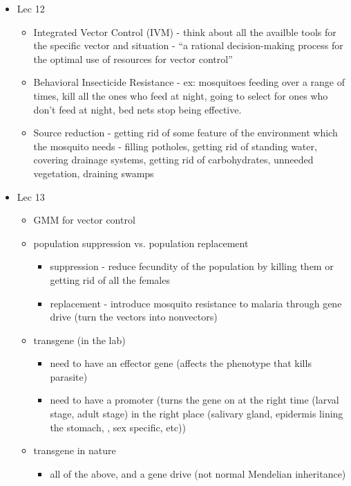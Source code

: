 \documentclass{article}
\begin{document}
\begin{itemize}
\begin{itemize}
        \end{itemize}
        \item Lec 12
        \begin{itemize}
            \item Integrated Vector Control (IVM) - think about all the availble tools for the specific vector and situation - ``a rational decision-making process for the optimal use of resources for vector control''
            \item Behavioral Insecticide Resistance - ex: mosquitoes feeding over a range of times, kill all the ones who feed at night, going to select for ones who don't feed at night, bed nets stop being effective.
            \item Source reduction - getting rid of some feature of the environment which the mosquito needs - filling potholes, getting rid of standing water, covering drainage systems, getting rid of carbohydrates, unneeded vegetation, draining swamps
        \end{itemize}
        \item Lec 13
        \begin{itemize}
            \item GMM for vector control
            \item population suppression vs. population replacement
            \begin{itemize}
                \item suppression - reduce fecundity of the population by killing them or getting rid of all the females
                \item replacement - introduce mosquito resistance to malaria through gene drive (turn the vectors into nonvectors)
            \end{itemize}
            \item transgene (in the lab)
            \begin{itemize}
                \item need to have an effector gene (affects the phenotype that kills parasite)
                \item need to have a promoter (turns the gene on at the right time (larval stage, adult stage) in the right place (salivary gland, epidermis lining the stomach, , sex specific, etc))
            \end{itemize}
            \item transgene in nature
            \begin{itemize}
                \item all of the above, and a gene drive (not normal Mendelian inheritance)

\end{itemize}
\end{itemize}
\end{itemize}
\end{document}
